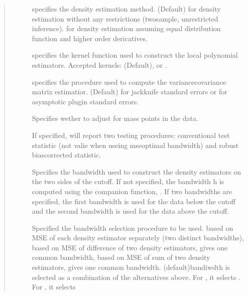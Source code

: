 \documentclass[letterpaper,10pt,english]{sphinxmanual}
\begin{document}
\begin{fulllineitems}
\begin{quote}
\begin{description}
\begin{description}
\item[{}] \leavevmode
\sphinxAtStartPar
specifies the density estimation method.  (Default) for density estimation without any restrictions (two\sphinxhyphen{}sample, unrestricted inference).  for density estimation assuming equal distribution function and higher order dericatives.

\item[{}] \leavevmode
\sphinxAtStartPar
specifies the kernel function used to construct the local polynomial estimators. Accepted kernels:  (Default),  or .

\item[{}] \leavevmode
\sphinxAtStartPar
specifies the procedure used to compute the variance\sphinxhyphen{}covariance matrix estimatior.  (Default) for jackknife standard errors or  for asymptotic plug\sphinxhyphen{}in standard errors.

\item[{}] \leavevmode
\sphinxAtStartPar
Specifies wether to adjust for mass points in the data.

\item[{}] \leavevmode
\sphinxAtStartPar
If specified, will report two testing procedures: conventional test statistic (not valie when useing mse\sphinxhyphen{}optimal bandwidth) and robust bias\sphinxhyphen{}corrected statistic.

\item[{}] \leavevmode
\sphinxAtStartPar
Specifies the bandwidth used to construct the density estimators on the two sides of the cutoff. If not specified, the bandwidth h is computed using the companion function, . If two bandwidths are specified, the first bandwidth is used for the data below the cutoff and the second bandwidth is used for the data above the cutoff.

\item[{}] \leavevmode
\sphinxAtStartPar
Specified the bandwidth selection procedure to be used. \sphinxhyphen{}based on MSE of each density estimator separately (two distinct bandwidths), \sphinxhyphen{} based on MSE of difference of two density estimators, gives one common bandwidth, \sphinxhyphen{}based on MSE of sum of two density estimators, gives one common bandwidth.  (default)\sphinxhyphen{}bandiwdth is selected as a combination of the alternatives above. For , it selects . For , it selects 


\end{description}
\end{description}
\end{quote}
\end{fulllineitems}
\end{document}
